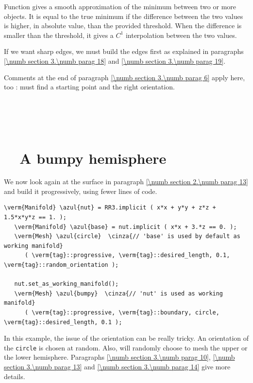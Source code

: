 Function {\small\tt {}} gives a smooth approximation of the minimum between
two or more {\small\tt {}} objects.
It is equal to the true minimum if the difference between the two values is higher, in
absolute value, than the provided threshold.
When the difference is smaller than the threshold, it gives a $ C^1 $ interpolation between
the two values.

If we want sharp edges, we must build the edges first as explained in paragraphs
\ref{\numb section 3.\numb parag 18} and \ref{\numb section 3.\numb parag 19}.

Comments at the end of paragraph \ref{\numb section 3.\numb parag 6} apply here, too :
{\maniFEM} must find a starting point and the right orientation.


\section{~~\cinza{[empty]}}\label{\numb section 3.\numb parag 8}


\section{~~A bumpy hemisphere}\label{\numb section 3.\numb parag 9}

We now look again at the surface in paragraph \ref{\numb section 2.\numb parag 13}
and build it progressively, using fewer lines of code.

\begin{Verbatim}[commandchars=\\\{\},formatcom=\small\tt,
   baselinestretch=0.94,framesep=2mm                      ]
   \verm{Manifold} \azul{nut} = RR3.implicit ( x*x + y*y + z*z + 1.5*x*y*z == 1. );
   \verm{Manifold} \azul{base} = nut.implicit ( x*x + 3.*z == 0. );
   \verm{Mesh} \azul{circle}  \cinza{// 'base' is used by default as working manifold}
      ( \verm{tag}::progressive, \verm{tag}::desired_length, 0.1, \verm{tag}::random_orientation );
   
   nut.set_as_working_manifold();
   \verm{Mesh} \azul{bumpy}  \cinza{// 'nut' is used as working manifold}
      ( \verm{tag}::progressive, \verm{tag}::boundary, circle, \verm{tag}::desired_length, 0.1 );
\end{Verbatim}

In this example, the issue of the orientation can be really tricky.
An orientation of the {\small\tt circle} is chosen at random.
Also, {\maniFEM} will randomly choose to mesh the upper or the lower hemisphere.
Paragraphs \ref{\numb section 3.\numb parag 10}, \ref{\numb section 3.\numb parag 13} and
\ref{\numb section 3.\numb parag 14} give more details.


